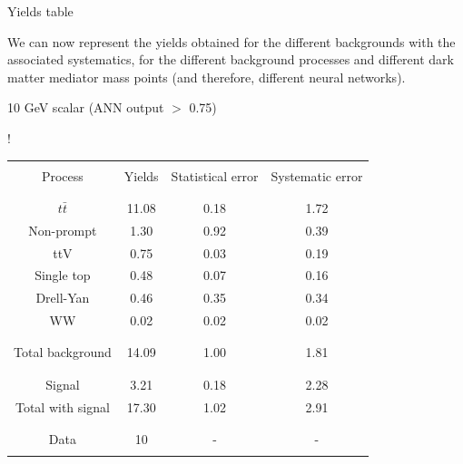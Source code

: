 \documentclass[8 pt]{beamer}
\begin{document}
\begin{frame}{Yields table}

	\justifying 
	We can now represent the yields obtained for the different backgrounds with the associated systematics, for the different background processes and different dark matter mediator mass points (and therefore, different neural networks). \vfill
	
	\begin{minipage}[c]{.48\linewidth}
	
	\begin{center}
	
	\begin{exampleblock}{}{ \begin{center} 10 GeV scalar (ANN output $>$ 0.75) \end{center}} \end{exampleblock} \vspace{6pt}
	
	\resizebox{170pt} {!}{
	\begin{tabular}{c|c|c|c}
	 	& & & \\
		Process & Yields & Statistical error & Systematic error \\
		& & & \\
		\hline \hline
		& & & \\
		$t \bar t$ & 11.08 & 0.18 & 1.72 \\
		Non-prompt & 1.30 & 0.92 & 0.39 \\
		ttV & 0.75 & 0.03 & 0.19 \\
		Single top & 0.48 & 0.07 & 0.16 \\
		Drell-Yan & 0.46 & 0.35 & 0.34 \\
		WW & 0.02 & 0.02 & 0.02 \\
		& & & \\
		\hline
		& & & \\
		Total background & 14.09 & 1.00 & 1.81 \\
		& & & \\
		\hline
		& & & \\
		Signal & 3.21 & 0.18 & 2.28 \\
		Total with signal & 17.30 & 1.02 & 2.91 \\
		& & & \\
		\hline
		& & & \\
		Data & 10 & - & - \\
		& & & \\
	\end{tabular}
	} 
	
	\end{center}


\end{minipage}
\end{frame}
\end{document}

